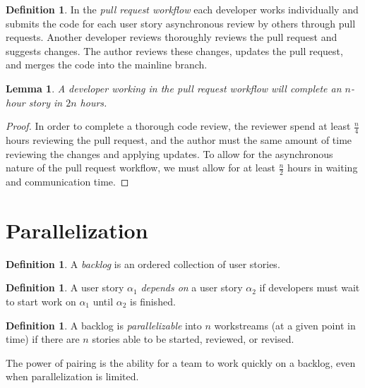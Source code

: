 \documentclass[letterpaper]{article}
\newtheorem{lemma}[theorem]{Lemma}
\theoremstyle{definition}
\newtheorem{definition}[theorem]{Definition}
\begin{document}
    \begin{definition}
        In the \textit{pull request workflow} each developer works individually and submits the code for each user story
        asynchronous review by others through pull requests.
        Another developer reviews thoroughly reviews the pull request and suggests changes.
        The author reviews these changes, updates the pull request, and merges the code into the mainline branch.
    \end{definition}

    \begin{lemma}
        \label{lemma:solo}
        A developer working in the pull request workflow will complete an $n$-hour story in $2n$ hours.
    \end{lemma}
    \begin{proof}
        In order to complete a thorough code review, the reviewer spend at least $\frac{n}{4}$ hours reviewing the pull
        request, and the author must the same amount of time reviewing the changes and applying updates.
        To allow for the asynchronous nature of the pull request workflow, we must allow for at least $\frac{n}{2}$
        hours in waiting and communication time.
    \end{proof}


    \section{Parallelization}\label{sec:parallelization}

    \begin{definition}
        A \textit{backlog} is an ordered collection of user stories.
    \end{definition}

    \begin{definition}
        A user story $\alpha_1$ \textit{depends on} a user story $\alpha_2$ if developers must wait to start work on
        $\alpha_1$ until $\alpha_2$ is finished.
    \end{definition}

    \begin{definition}
        A backlog is \textit{parallelizable} into $n$ workstreams (at a given point in time) if there are $n$ stories
        able to be started, reviewed, or revised.
    \end{definition}

    The power of pairing is the ability for a team to work quickly on a backlog, even when parallelization is limited.
\end{document}
